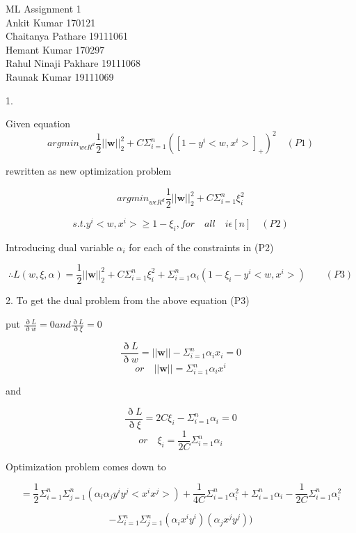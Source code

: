 \documentclass{article}
\begin{document}
ML Assignment 1 \\
Ankit Kumar 170121 \\
Chaitanya Pathare 19111061 \\
Hemant Kumar 170297 \\
Rahul Ninaji Pakhare 19111068 \\
Raunak Kumar 19111069 \\

\vspace{2mm}

1.

Given equation \[ argmin _{ w \epsilon R^d } \frac{1}{2} || \textbf{w} || _2 ^2 + C \Sigma _{i=1} ^n  ([ 1 - y^i <w,x^i> ]_+)^2  \quad (P1) \]

rewritten as new optimization problem

\[ argmin _{ w \epsilon R^d } \frac{1}{2} || \textbf{w} || _2 ^2 + C \Sigma _{i=1} ^n \xi _i^2   \]

\[ s.t. y^i <w,x^i>  \geqslant 1 - \xi _i , for \quad all \quad i \epsilon [n] \quad (P2) \]

Introducing dual variable $ \alpha _i $ for each of the constraints in (P2)

\[ \therefore L(w, \xi , \alpha ) =  \frac{1}{2} || \textbf{w} || _2 ^2 + C \Sigma _{i=1} ^n \xi _i^2 + \Sigma _{i=1} ^n \alpha _i ( 1 - \xi _i -y^i<w,x^i>)   \qquad (P3) \]




\newpage


2. To get the dual problem  from the above equation (P3)

put $  \frac{ \eth L }{ \eth w } = 0 and  \frac{ \eth L }{ \eth \xi } = 0  $

\[    \frac{ \eth L }{ \eth w } = ||\textbf{w}|| - \Sigma _{i=1} ^n \alpha _i x_i =0  \]
\[ or \quad ||\textbf{w}|| = \Sigma _{i=1} ^n \alpha _i x^i \]

 and

\[    \frac{ \eth L }{ \eth \xi } =2C \xi _i  - \Sigma _{i=1} ^n \alpha _i =0  \]
\[ or \quad \xi _i = \frac{1}{2C} \Sigma _{i=1} ^n \alpha _i  \]


Optimization problem comes down to 

\[ = \frac{1}{2} \Sigma _{i=1} ^n \Sigma _{j=1} ^n ( \alpha _i \alpha _j y^i y^j< x^i x^j>) +  \frac{1}{4C} \Sigma _{i=1} ^n  \alpha _i ^2 + \Sigma _{ i=1 } ^n \alpha_i - \frac{1}{2C}\Sigma _{i=1} ^n  \alpha _i ^2 \]

 \[ -  \Sigma _{i=1} ^n \Sigma _{j=1} ^n ( \alpha _i x^i y^i)(\alpha _j x^j y^j)) \]
\end{document}
